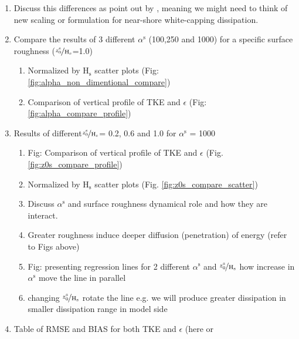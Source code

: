 \documentclass[final]{svjour3}
\begin{document}
\begin{enumerate}
\begin{enumerate}
\begin{enumerate}
          \item Discuss this differences as point out by
          \cite{feddersen2007direct}, meaning we might need to think of new
          scaling or formulation for near-shore white-capping dissipation.
          \item Compare the results of 3 different $\alpha^\mathrm{s}$ (100,250 and 1000)
          for a specific surface roughness ($\nicefrac{z_0^\mathrm{s}}{
          \mathrm{H}_\mathrm{s}}$=1.0)
                \begin{enumerate}
                    \item Normalized by H$_\mathrm{s}$ scatter plots
                    (Fig: \ref{fig:alpha_non_dimentional_compare})
                    \item Comparison of vertical profile of TKE and $\epsilon$
                    (Fig: \ref{fig:alpha_compare_profile})
                \end{enumerate}
          \item Results of different$\nicefrac{z_0^\mathrm{s}}
          {\mathrm{H}_\mathrm{s}}$= 0.2, 0.6 and 1.0 for $\alpha^\mathrm{s}$ =
          1000 
          \begin{enumerate}
              \item Fig: Comparison of vertical profile of TKE and
                   $\epsilon$ (Fig. \ref{fig:z0s_compare_profile})
              \item Normalized by H$_\mathrm{s}$ scatter plots (Fig.
                  \ref{fig:z0s_compare_scatter})
              \item Discuss $\alpha^\mathrm{s}$ and surface roughness dynamical
                   role and how they are interact.
              \item Greater roughness induce deeper diffusion (penetration) of
                   energy (refer to Figs above)
              \item Fig: presenting regression lines for 2 different
               $\alpha^\mathrm{s}$ and
               $\nicefrac{z_0^\mathrm{s}}{\mathrm{H}_\mathrm{s}}$ how increase
               in  $\alpha^\mathrm{s}$ move the line in parallel 
              \item changing $\nicefrac{z_0^\mathrm{s}}{\mathrm{H}_\mathrm{s}}$
              rotate the line  e.g. we will produce greater dissipation in
              smaller  dissipation range in model side 
          \end{enumerate}
          \item Table of RMSE and BIAS for both TKE and $\epsilon$ (here or

\end{enumerate}
\end{enumerate}
\end{enumerate}
\end{document}
